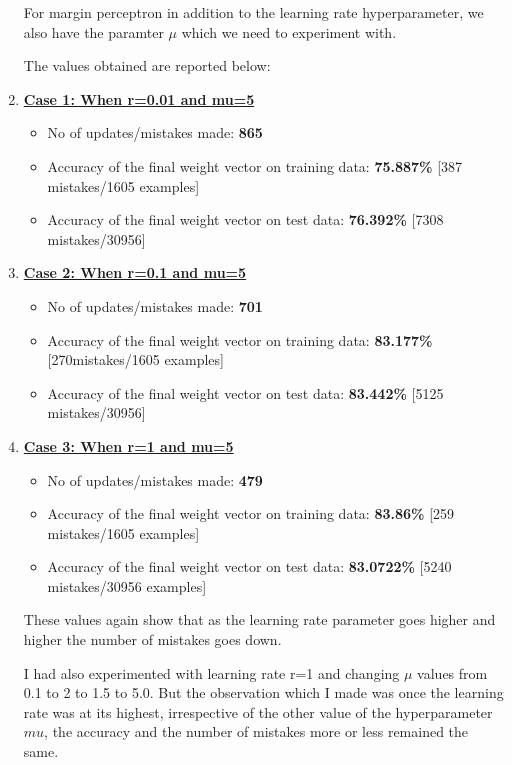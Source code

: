 \documentclass[12pt, fullpage,letterpaper]{article}
\begin{document}
\begin{enumerate}
		For margin perceptron in addition to the learning rate hyperparameter, we also have the paramter $\mu$ which we need to experiment with.
		
		The values obtained are reported below:
		
		\item[] \textbf {\underline{ Case 1: When r=0.01 and mu=5}}
		\begin{itemize}
			\item No of updates/mistakes made: \textbf{865} 
			\item Accuracy of the final weight vector on training data: \textbf{75.887\%} [387 mistakes/1605 examples]
			\item Accuracy of the final weight vector on test data: \textbf{76.392\%} [7308 mistakes/30956]
		\end{itemize}
		
		\item[] \textbf { \underline{Case 2: When r=0.1 and mu=5}}
		\begin{itemize}
			\item No of updates/mistakes made: \textbf{701} 
			\item Accuracy of the final weight vector on training data: \textbf{83.177\%} [270mistakes/1605 examples]
			\item Accuracy of the final weight vector on test data: \textbf{83.442\%} [5125 mistakes/30956]
		\end{itemize}
		
		\item[] \textbf {\underline{ Case 3: When r=1 and mu=5}}
		\begin{itemize}
			\item No of updates/mistakes made: \textbf{479} 
			\item Accuracy of the final weight vector on training data: \textbf{83.86\%} [259 mistakes/1605 examples]
			\item Accuracy of the final weight vector on test data: \textbf{83.0722\%} [5240 mistakes/30956 examples]
		\end{itemize}
		
		These values again show that as the learning rate parameter goes higher and higher the number of mistakes goes down.
		
		I had also experimented with learning rate r=1 and changing $\mu$ values from 0.1 to 2 to 1.5 to 5.0. But the observation which I made was once the learning rate was at its highest, irrespective of the other value of the hyperparameter $mu$, the accuracy and the number of mistakes more or less remained the same.
		

\end{enumerate}
\end{document}

